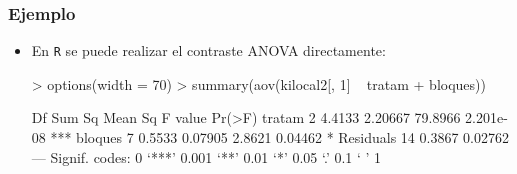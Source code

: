 \begin{frame}[fragile]
\frametitle{Ejemplo}
\begin{itemize}
\item<2-> En {\tt R} se puede realizar el contraste ANOVA directamente:
{\small
\begin{Schunk}
\begin{Sinput}
> options(width = 70)
> summary(aov(kilocal2[, 1] ~ tratam + bloques))
\end{Sinput}
\begin{Soutput}
            Df Sum Sq Mean Sq F value    Pr(>F)    
tratam       2 4.4133 2.20667 79.8966 2.201e-08 ***
bloques      7 0.5533 0.07905  2.8621   0.04462 *  
Residuals   14 0.3867 0.02762                      
---
Signif. codes:  0 ‘***’ 0.001 ‘**’ 0.01 ‘*’ 0.05 ‘.’ 0.1 ‘ ’ 1 
\end{Soutput}
\end{Schunk}
}

\end{itemize}
\end{frame}
